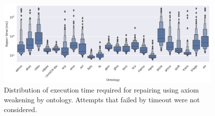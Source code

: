 \begin{figure}[ht]
  \centering
  \includegraphics[width=\textwidth]{resources/time-ontology-violin.png}
  \caption{Distribution of execution time required for repairing using axiom weakening by ontology. Attempts that failed by timeout were not considered.}
\end{figure}

